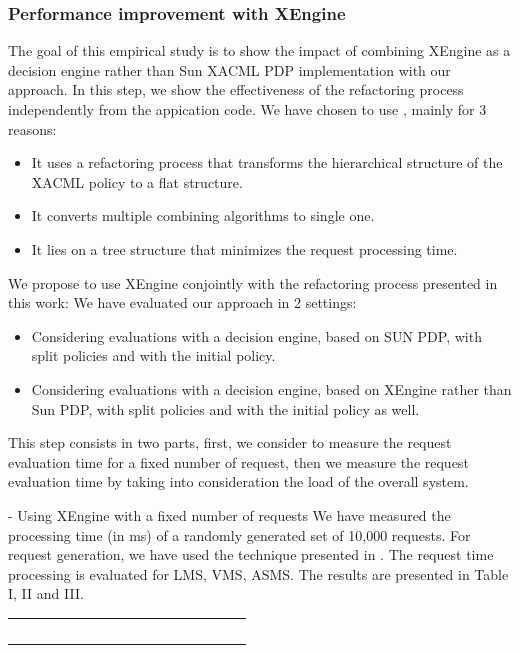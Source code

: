 {\subsubsection{Performance improvement with XEngine}
The goal of this empirical study is to show the impact of combining XEngine as a decision engine rather than Sun XACML PDP implementation with our approach. 
In this step, we show the effectiveness of the refactoring process independently from the appication code.
We have chosen to use \cite{Xengine}, mainly for 3 reasons:

\begin{itemize}
\item It uses a refactoring process that transforms the hierarchical structure of the XACML policy to a flat structure. 
\item It converts multiple combining algorithms to single one.
\item It lies on a tree structure that minimizes the request processing time.
\end{itemize}
We propose to use XEngine conjointly with the refactoring process presented in this work:
We have evaluated our approach in 2 settings:
\begin{itemize}
\item Considering evaluations with a decision engine, based on SUN PDP, with split policies and with the initial policy.  
\item Considering evaluations with a decision engine, based on XEngine rather than Sun PDP, with split policies and with the initial policy as well.  
\end{itemize}

This step consists in two parts, first, we consider to measure the request evaluation time for a fixed number of request, then we measure the request evaluation
 time by taking into consideration the load of the overall system.


- Using XEngine with a fixed number of requests
We have measured the processing time (in ms) of a randomly generated set of 10,000 requests. For request generation, we have used the technique presented 
in \cite{request}. The request time processing is evaluated for LMS, VMS, ASMS. The results are presented in Table I, II and III.

\begin{table}[h!]
\centering
\begin{tabular}{|>{\tiny}c|>{\tiny}c|>{\tiny}c|>{\tiny}c|>{\tiny}c|>{\tiny}c|>{\tiny}c|>{\tiny}c|>{\tiny}c|}   
\hline  \rowcolor{black} \scriptsize \bf \textcolor {white}{}
& \scriptsize \bf \textcolor {white}{SAR}
& \scriptsize \bf \textcolor {white}{AR}
& \scriptsize \bf \textcolor  {white}{SA}
& \scriptsize \bf \textcolor  {white}{SR}
& \scriptsize \bf \textcolor  {white}{R}


\end{tabular}
\end{table}}
